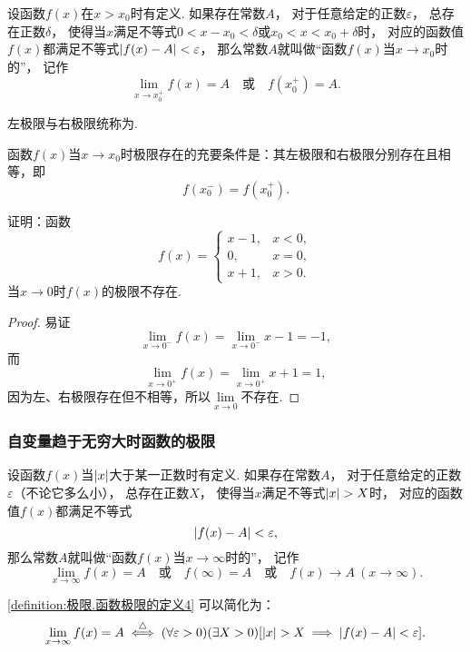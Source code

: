 \begin{definition}\label{definition:极限.函数极限的定义3}
设函数\(f(x)\)在\(x > x_0\)时有定义.
如果存在常数\(A\)，
对于任意给定的正数\(\varepsilon\)，
总存在正数\(\delta\)，
使得当\(x\)满足不等式\(0 < x - x_0 < \delta\)或\(x_0 < x < x_0 + \delta\)时，
对应的函数值\(f(x)\)都满足不等式\(\abs{f(x) - A} < \varepsilon\)，
那么常数\(A\)就叫做“函数\(f(x)\)当\(x \to x_0\)时的”，
记作\[
\lim\limits_{x \to x_0^+} f(x) = A
\quad\text{或}\quad
f(x_0^+) = A.
\]
\end{definition}
左极限与右极限统称为.

\begin{theorem}
函数\(f(x)\)当\(x \to x_0\)时极限存在的充要条件是：其左极限和右极限分别存在且相等，即\[
f(x_0^-) = f(x_0^+).
\]
\end{theorem}

\begin{example}
证明：函数\[
f(x) = \left\{ \begin{array}{lc}
x-1, & x<0, \\
0, & x=0, \\
x+1, & x>0.
\end{array} \right.
\]当\(x\to0\)时\(f(x)\)的极限不存在.
\begin{proof}
易证\[
\lim\limits_{x\to0^-} f(x) = \lim\limits_{x\to0^-} x-1 = -1,
\]而\[
\lim\limits_{x\to0^+} f(x) = \lim\limits_{x\to0^+} x+1 = 1,
\]因为左、右极限存在但不相等，所以\(\lim\limits_{x\to0}\)不存在.
\end{proof}
\end{example}

\subsubsection*{自变量趋于无穷大时函数的极限}
\begin{definition}\label{definition:极限.函数极限的定义4}
设函数\(f(x)\)当\(\abs{x}\)大于某一正数时有定义.
如果存在常数\(A\)，
对于任意给定的正数\(\varepsilon\)（不论它多么小），
总存在正数\(X\)，
使得当\(x\)满足不等式\(\abs{x} > X\)时，
对应的函数值\(f(x)\)都满足不等式\[
\abs{f(x) - A} < \varepsilon,
\]那么常数\(A\)就叫做“函数\(f(x)\)当\(x \to \infty\)时的”，
记作\[
\lim\limits_{x \to \infty} f(x) = A
\quad\text{或}\quad
f(\infty) = A
\quad\text{或}\quad
f(x) \to A\ (x \to \infty).
\]
\end{definition}
\cref{definition:极限.函数极限的定义4} 可以简化为：
\[
	\lim\limits_{x\to\infty} f(x) = A
	\overset{\triangle}{\iff}
	(\forall\varepsilon>0)
	(\exists X>0)
	[
		\abs{x} > X
		\implies
		\abs{f(x) - A} < \varepsilon
	].
\]

